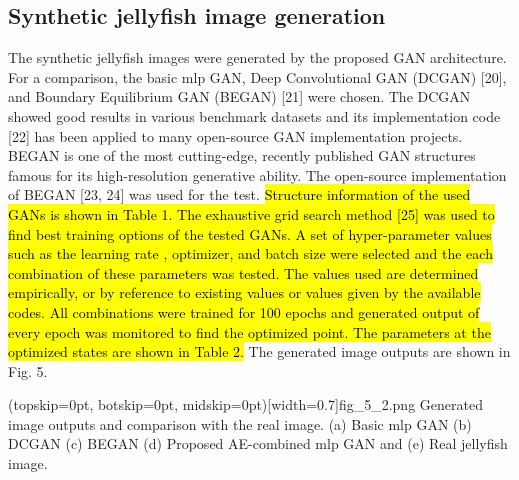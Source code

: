 \documentclass{ieeeaccess}
\begin{document}
\subsection{Synthetic jellyfish image generation}
The synthetic jellyfish images were generated by the proposed GAN architecture. For a comparison, the basic mlp GAN, Deep Convolutional GAN (DCGAN) [20], and Boundary Equilibrium GAN (BEGAN) [21] were chosen. The DCGAN showed good results in various benchmark datasets and its implementation code [22] has been applied to many open-source GAN implementation projects. BEGAN is one of the most cutting-edge, recently published GAN structures famous for its high-resolution generative ability. The open-source implementation of BEGAN [23, 24] was used for the test. \hl{Structure information of the used GANs is shown in Table 1. The exhaustive grid search method [25] was used to find best training options of the tested GANs. A set of hyper-parameter values such as the learning rate , optimizer, and batch size were selected and the each combination of these parameters was tested. The values used are determined empirically, or by reference to existing values or values given by the available codes. All combinations were trained for 100 epochs and generated output of every epoch was monitored to find the optimized point. The parameters at the optimized states are shown in Table 2.} The generated image outputs are shown in Fig. 5. 

\Figure[!t](topskip=0pt, botskip=0pt, midskip=0pt)[width=0.7\linewidth]{fig_5_2.png}
{Generated image outputs and comparison with the real image. (a) Basic mlp GAN (b) DCGAN (c) BEGAN (d) Proposed AE-combined mlp GAN and (e) Real jellyfish image.\label{fig5}}
\end{document}
